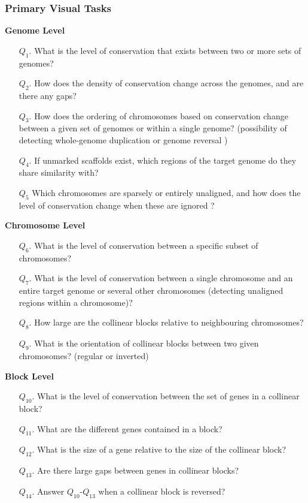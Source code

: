 \subsubsection{Primary Visual Tasks}

\smallskip
\noindent
\textbf{Genome Level}
\smallskip
\begin{enumerate}
\item [$Q_1$.] What is the level of conservation that exists between two or more sets of genomes?
\item [$Q_2$.] How does the density of conservation change across the genomes, and are there any gaps?
\item [$Q_3$.] How does the ordering of chromosomes based on conservation change between a given set of genomes or within a single genome? (possibility of detecting whole-genome duplication or genome reversal )
\item [$Q_4$.] If unmarked scaffolds exist, which regions of the target genome do they share similarity with?
\item[$Q_5$] Which chromosomes are sparsely or entirely unaligned, and how does the level of conservation change when these are ignored ?
\end{enumerate}

\smallskip
\noindent
\textbf{Chromosome Level}
\smallskip
\begin{enumerate}
\item [$Q_6$.]What is the level of conservation between a specific subset of chromosomes?
\item [$Q_7$.] What is the level of conservation between a single chromosome and an entire target genome or several other chromosomes (detecting unaligned regions within a chromosome)?
\item [$Q_8$.] 
How large are the collinear blocks relative to neighbouring chromosomes?
\item [$Q_9$.]What is the orientation of collinear blocks between two given chromosomes? (regular or inverted)
\end{enumerate}

\smallskip
\noindent
\textbf{Block Level}
\smallskip
\begin{enumerate}
\item [$Q_{10}$.]What is the level of conservation between the set of genes in a collinear block?
\item [$Q_{11}$.] What are the different genes contained in a block?
\item [$Q_{12}$.] What is the size of a gene relative to the size of the collinear block?
\item [$Q_{13}$.] Are there large gaps between genes in collinear blocks?
\item [$Q_{14}$.] Answer $Q_{10}$-$Q_{13}$ when a collinear block is reversed?
\end{enumerate}

